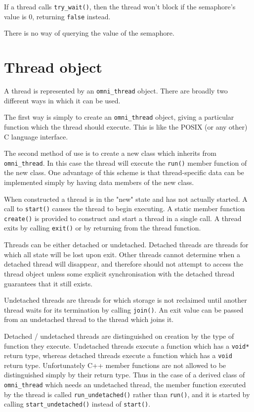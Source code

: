 \documentclass[11pt,oneside,a4paper]{article}
\newcommand{\dsc}{\discretionary{}{}}
\begin{document}
If a thread calls \texttt{try\_wait()}, then the thread won't block if
the semaphore's value is 0, returning \texttt{false} instead.

There is no way of querying the value of the semaphore.



\section{Thread object}

A thread is represented by an \texttt{omni\_thread} object.  There are
broadly two different ways in which it can be used.

The first way is simply to create an \texttt{omni\_thread} object,
giving a particular function which the thread should execute.  This is
like the POSIX (or any other) C language interface.

The second method of use is to create a new class which inherits from
\texttt{omni\_\dsc{}thread}.  In this case the thread will execute the
\texttt{run()} member function of the new class.  One advantage of
this scheme is that thread-specific data can be implemented simply by
having data members of the new class.

When constructed a thread is in the "new" state and has not actually
started.  A call to \texttt{start()} causes the thread to begin
executing.  A static member function \texttt{create()} is provided to
construct and start a thread in a single call.  A thread exits by
calling \texttt{exit()} or by returning from the thread function.

Threads can be either detached or undetached.  Detached threads are
threads for which all state will be lost upon exit.  Other threads
cannot determine when a detached thread will disappear, and therefore
should not attempt to access the thread object unless some explicit
synchronisation with the detached thread guarantees that it still
exists.

Undetached threads are threads for which storage is not reclaimed
until another thread waits for its termination by calling
\texttt{join()}.  An exit value can be passed from an undetached
thread to the thread which joins it.

Detached / undetached threads are distinguished on creation by the
type of function they execute.  Undetached threads execute a function
which has a \texttt{void*} return type, whereas detached threads
execute a function which has a \texttt{void} return type.
Unfortunately C++ member functions are not allowed to be distinguished
simply by their return type.  Thus in the case of a derived class of
\texttt{omni\_thread} which needs an undetached thread, the member
function executed by the thread is called \texttt{run\_undetached()}
rather than \texttt{run()}, and it is started by calling
\texttt{start\_\dsc{}undetached()} instead of \texttt{start()}.
\end{document}
